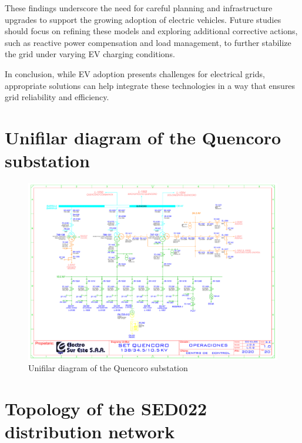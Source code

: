 \documentclass[12pt, 3p]{elsarticle}
\begin{document}
These findings underscore the need for careful planning and infrastructure upgrades to support the growing adoption of electric vehicles. Future studies should focus on refining these models and exploring additional corrective actions, such as reactive power compensation and load management, to further stabilize the grid under varying EV charging conditions.

\noindent In conclusion, while EV adoption presents challenges for electrical grids, appropriate solutions can help integrate these technologies in a way that ensures grid reliability and efficiency.

\newpage
\appendix
\section{Unifilar diagram of the Quencoro substation}
\label{appndx:unifilar}

\begin{landscape}
    \begin{figure}[!t]
        \centering
        \includegraphics[height=0.9\textheight]{./Figures/SE_QUENCORO_unifilar.pdf}
        \caption{Unifilar diagram of the Quencoro substation}
        \label{fig:unifilar}
    \end{figure}
\end{landscape}

\section{Topology of the SED022 distribution network}
\label{appndx:topology}
\end{document}
